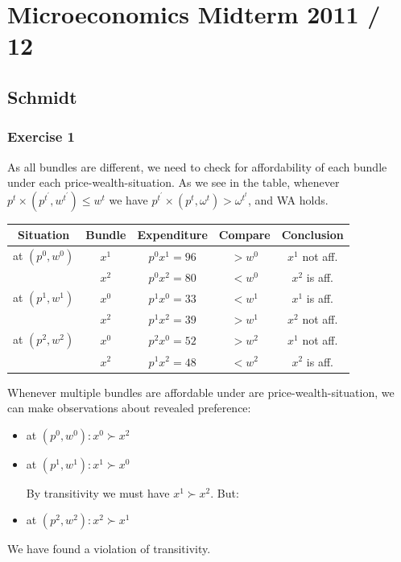 \section*{Microeconomics Midterm 2011 / 12}

{
\subsection*{Schmidt}

\subsubsection*{Exercise 1}

\begin{enumerate}[label=(\alph*)]
{\item 
As all bundles are different, we need to check for affordability of each bundle under each price-wealth-situation.
As we see in the table, whenever $p^t \times\left(p^{t^{\prime}}, w^{t^{\prime}}\right) \leq w^t$ we have $p^{t^{\prime}} \times\left(p^t, \omega^t\right)>\omega^{t^t}$, and WA holds.

\begin{table}[h!]
    \centering
    \begin{tabular}{c|c|c|c|c}
        Situation & Bundle & Expenditure & Compare & Conclusion \\\hline
        at $\left(p^0, w^0\right)$ & $x^1$ & $p^0 x^1=96$ & $>w^0$ & $x^1$ not aff. \\
        & $x^2$ & $p^0 x^2=80$ & $<w^0$ & $x^2$ is aff. \\
        at $\left(p^1, w^1\right)$ & $x^0$ & $p^1 x^0=33$ & $<w^1$ & $x^1$ is aff. \\
        & $x^2$ & $p^1 x^2=39$ & $>w^1$ & $x^2$ not aff. \\
        at $\left(p^2, w^2\right)$ & $x^0$ & $p^2 x^0=52$ & $>w^2$ & $x^1$ not aff. \\
        & $x^2$ & $p^1 x^2=48$ & $<w^2$ & $x^2$ is aff. \\
    \end{tabular}
\end{table}
}

{\item 
Whenever multiple bundles are affordable under are price-wealth-situation, we can make observations about revealed preference:

\begin{itemize}
    \item at $\left(p^0, w^0\right): x^0 \succ x^2$
    \item at $\left(p^1, w^1\right): x^1 \succ x^0$

    By transitivity we must have $x^1 \succ x^2$. But:
    \item at $\left(p^2, w^2\right): x^2 \succ x^1$
\end{itemize}

We have found a violation of transitivity.
}
\end{enumerate}
}

